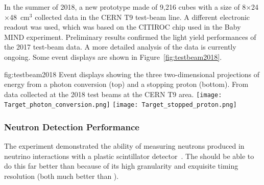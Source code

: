 In the summer of 2018, a new prototype made of 9,216 cubes with a size of 8$\times$24$\times$48~cm$^{3}$  collected data in the CERN T9 test-beam line.
A different electronic readout was used, which was based on the CITIROC chip used in the Baby MIND experiment.
Preliminary results confirmed the light yield performances of the 2017 test-beam data. A more detailed analysis of the data is currently ongoing.
Some event displays are shown in Figure~\ref{fig:testbeam2018}.

\begin{dunefigure}{fig:testbeam2018}
{Event displays showing the three two-dimensional projections of energy from a photon conversion (top) and a stopping proton (bottom). From data collected at the 2018 test beams at the CERN T9 area.}
\texttt{[image: Target\_photon\_conversion.png]}
\texttt{[image: Target\_stopped\_proton.png]}
\end{dunefigure}


\subsubsection{Neutron Detection Performance}

The  experiment demonstrated the ability of measuring neutrons produced in neutrino interactions with a plastic scintillator detector~\cite{Elkins:2019vmy}. 
The  should be able to do this far better than  because of its high granularity and exquisite timing resolution (both much better than ). 

